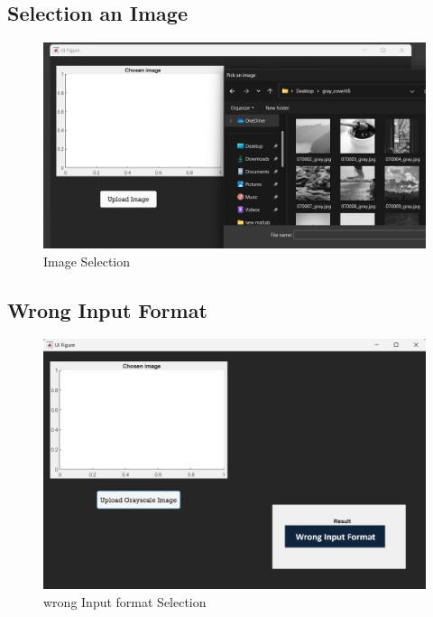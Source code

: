 \subsection{Selection an Image}
\begin{figure}[H]
    \centering
    \includegraphics[width=140mm]{./img/selectsample.png}
    \caption{Image Selection}
\end{figure}
\subsection{Wrong Input Format}
\begin{figure}[H]
    \centering
    \includegraphics[width=140mm]{./img/error.png}
    \caption{wrong Input format Selection}
\end{figure}

